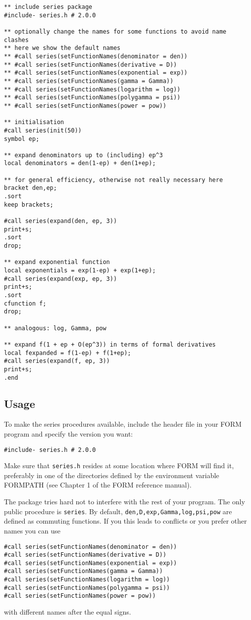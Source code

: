 \documentclass[titlepage]{article}
\begin{document}
\begin{lstlisting}
** include series package
#include- series.h # 2.0.0

** optionally change the names for some functions to avoid name clashes
** here we show the default names
** #call series(setFunctionNames(denominator = den))
** #call series(setFunctionNames(derivative = D))
** #call series(setFunctionNames(exponential = exp))
** #call series(setFunctionNames(gamma = Gamma))
** #call series(setFunctionNames(logarithm = log))
** #call series(setFunctionNames(polygamma = psi))
** #call series(setFunctionNames(power = pow))

** initialisation
#call series(init(50))
symbol ep;

** expand denominators up to (including) ep^3
local denominators = den(1-ep) + den(1+ep);

** for general efficiency, otherwise not really necessary here
bracket den,ep;
.sort
keep brackets;

#call series(expand(den, ep, 3))
print+s;
.sort
drop;

** expand exponential function
local exponentials = exp(1-ep) + exp(1+ep);
#call series(expand(exp, ep, 3))
print+s;
.sort
cfunction f;
drop;

** analogous: log, Gamma, pow

** expand f(1 + ep + O(ep^3)) in terms of formal derivatives
local fexpanded = f(1-ep) + f(1+ep);
#call series(expand(f, ep, 3))
print+s;
.end
\end{lstlisting}

\subsection{Usage}
\label{sec:usage}

To make the series procedures available, include the header file in your
FORM program and specify the version you want:
\begin{lstlisting}
#include- series.h # 2.0.0
\end{lstlisting}
Make sure that {\tt series.h} resides at some location where FORM will find
it, preferably in one of the directories defined by the environment
variable \mbox{FORMPATH} (see Chapter 1 of the FORM reference
manual).

The package tries hard not to interfere with the rest of your
program. The only public procedure is \lstinline!series!. By default,
\lstinline!den,D,exp,Gamma,log,psi,pow! are defined as commuting
functions. If you this leads to conflicts or you prefer other names
you can use
\begin{lstlisting}
#call series(setFunctionNames(denominator = den))
#call series(setFunctionNames(derivative = D))
#call series(setFunctionNames(exponential = exp))
#call series(setFunctionNames(gamma = Gamma))
#call series(setFunctionNames(logarithm = log))
#call series(setFunctionNames(polygamma = psi))
#call series(setFunctionNames(power = pow))
\end{lstlisting}
with different names after the equal signs.
\end{document}
